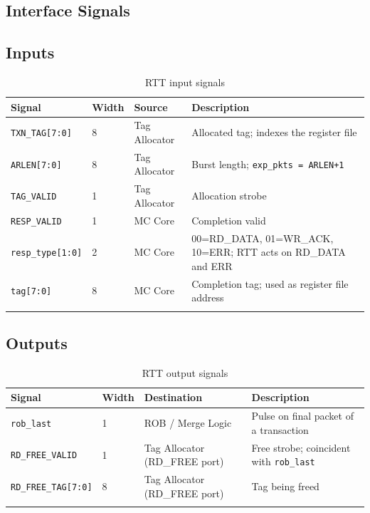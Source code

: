 \subsection{Interface Signals}

\subsection{Inputs}

\begin{longtable}{p{3cm}p{1cm}p{3cm}p{7cm}}
\toprule
\textbf{Signal} & \textbf{Width} & \textbf{Source} & \textbf{Description} \\
\midrule
\texttt{TXN\_TAG[7:0]}    & 8 & Tag Allocator & Allocated tag; indexes the register file \\
\texttt{ARLEN[7:0]}       & 8 & Tag Allocator & Burst length; \texttt{exp\_pkts = ARLEN+1} \\
\texttt{TAG\_VALID}       & 1 & Tag Allocator & Allocation strobe \\
\texttt{RESP\_VALID}      & 1 & MC Core       & Completion valid \\
\texttt{resp\_type[1:0]}  & 2 & MC Core       & 00=RD\_DATA, 01=WR\_ACK, 10=ERR; RTT acts on RD\_DATA and ERR \\
\texttt{tag[7:0]}         & 8 & MC Core       & Completion tag; used as register file address \\
\bottomrule
\caption{RTT input signals}
\end{longtable}

\subsection{Outputs}

\begin{longtable}{p{3cm}p{1cm}p{3cm}p{7cm}}
\toprule
\textbf{Signal} & \textbf{Width} & \textbf{Destination} & \textbf{Description} \\
\midrule
\texttt{rob\_last}          & 1 & ROB / Merge Logic             & Pulse on final packet of a transaction \\
\texttt{RD\_FREE\_VALID}    & 1 & Tag Allocator (RD\_FREE port) & Free strobe; coincident with \texttt{rob\_last} \\
\texttt{RD\_FREE\_TAG[7:0]} & 8 & Tag Allocator (RD\_FREE port) & Tag being freed \\
\bottomrule
\caption{RTT output signals}
\end{longtable}

